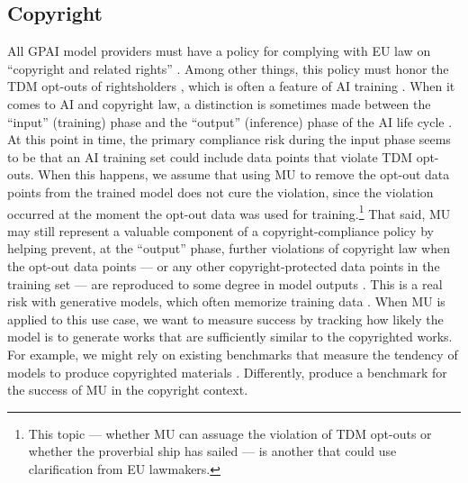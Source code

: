 \subsection{Copyright}
All GPAI model providers must have a policy for complying with EU law on ``copyright and related rights'' \citep[Art. 53.c]{european_union_ai_act_2024}. Among other things, this policy must honor the TDM opt-outs of rightsholders \citep[Art. 53.c; Rec. 105]{european_union_ai_act_2024}, which is often a feature of AI training \citep{Rosati_2024, kneschke2024laion}. When it comes to AI and copyright law, a distinction is sometimes made between the ``input'' (training) phase and the ``output'' (inference) phase of the AI life cycle \citep{Rosati_2024, quintais2024generative}. At this point in time, the primary compliance risk during the input phase seems to be that an AI training set could include data points that violate TDM opt-outs. When this happens, we assume that using MU to remove the opt-out data points from the trained model does not cure the violation, since the violation occurred at the moment the opt-out data was used for training.\footnote{This topic --- whether MU can assuage the violation of TDM opt-outs or whether the proverbial ship has sailed --- is another that could use clarification from EU lawmakers.\label{footnote7}} That said, MU may still represent a valuable component of a copyright-compliance policy by helping prevent, at the ``output'' phase, further violations of copyright law when the opt-out data points --- or any other copyright-protected data points in the training set --- are reproduced to some degree in model outputs \citep{Rosati_2024}. This is a real risk with generative models, which often memorize training data \citep{cooper2024files, carlini2023extractingtrainingdatadiffusion}. When MU is applied to this use case, we want to measure success by tracking how likely the model is to generate works that are sufficiently similar to the copyrighted works. For example, we might rely on existing benchmarks that measure the tendency of models to produce copyrighted materials \citep{liu2024shieldevaluationdefensestrategies, chen2024copybenchmeasuringliteralnonliteral}. Differently, \citet{ma2024datasetbenchmarkcopyrightinfringement} produce a benchmark for the success of MU in the copyright context.

